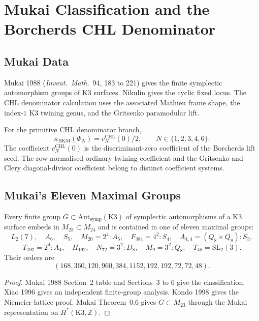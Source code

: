 \providecommand{\BKM}{\mathrm{BKM}}
\providecommand{\ch}{\mathrm{ch}}
\providecommand{\cat}{\mathrm{cat}}
\providecommand{\fib}{\mathrm{fiber}}
\providecommand{\cO}{\mathcal{O}}
\providecommand{\K}{\mathrm{K3}}
\providecommand{\Fix}{\mathrm{Fix}}
\providecommand{\symp}{\mathrm{symp}}
\providecommand{\Aut}{\mathrm{Aut}}
\providecommand{\GC}{\mathrm{GC}}
\providecommand{\CHL}{\mathrm{CHL}}
\providecommand{\DT}{\mathrm{DT}}
\providecommand{\fr}{\mathrm{fr}}
\providecommand{\topo}{\mathrm{top}}
\providecommand{\dd}{\mathrm{dd}}
\providecommand{\wt}{\operatorname{wt}}
\providecommand{\kBKM}{\kappa_{\mathrm{BKM}}}
\providecommand{\kch}{\kappa_{\mathrm{ch}}}
\providecommand{\kcat}{\kappa_{\mathrm{cat}}}
\providecommand{\kfib}{\kappa_{\mathrm{fiber}}}

\section*{Mukai Classification and the Borcherds CHL Denominator}
\label{wn:sec:mukai-classification-borcherds-chl}

\subsection*{Mukai Data}

Mukai 1988 (\emph{Invent.\ Math.}~94, 183 to 221) gives the finite
symplectic automorphism groups of K3 surfaces.  Nikulin gives the
cyclic fixed locus.  The CHL denominator calculation uses the associated
Mathieu frame shape, the index-$1$ K3 twining genus, and the Gritsenko
paramodular lift.

For the primitive CHL denominator branch,
\[
  \kBKM(\Phi_N)=c_N^{\CHL}(0)/2,\qquad N\in\{1,2,3,4,6\}.
\]
The coefficient $c_N^{\CHL}(0)$ is the discriminant-zero coefficient of
the Borcherds lift seed.  The row-normalised ordinary twining
coefficient and the Gritsenko and Clery diagonal-divisor coefficient
belong to distinct coefficient systems.

\subsection*{Mukai's Eleven Maximal Groups}

\begin{theorem}
\label{wn:thm:mukai-eleven-groups}
Every finite group $G \subset \Aut_{\symp}(\K)$ of symplectic
automorphisms of a K3 surface embeds in $M_{23} \subset M_{24}$ and is
contained in one of eleven maximal groups:
\[
  L_2(7),\quad A_6,\quad S_5,\quad M_{20}=2^4{:}A_5,\quad
  F_{384}=4^2{:}S_4,\quad A_{4,4}=(Q_8 \times Q_8){:}S_3,
\]
\[
  T_{192}=2^4{:}A_4,\quad H_{192},\quad N_{72}=3^2{:}D_8,\quad
  M_9=3^2{:}Q_8,\quad T_{48}=\mathrm{SL}_2(3).
\]
Their orders are
\[
  (168,360,120,960,384,1152,192,192,72,72,48).
\]
\end{theorem}
\begin{proof}
Mukai 1988 Section~2 table and Sections~3 to 6 give the classification.
Xiao 1996 gives an independent finite-group analysis.  Kondo 1998 gives
the Niemeier-lattice proof.  Mukai Theorem~0.6 gives
$G\subset M_{23}$ through the Mukai representation on
$H^*(\K,\mathbb Z)$.
\end{proof}

